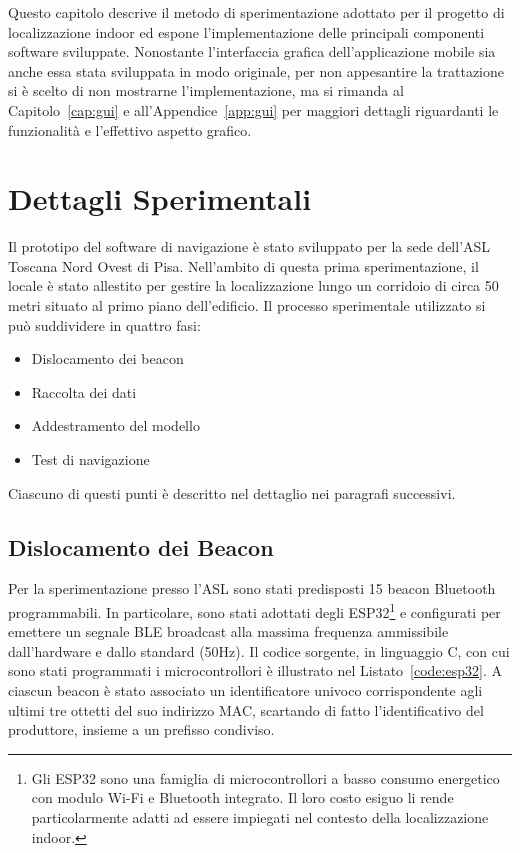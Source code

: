 \newcommand{\inputsource}[2]{%
	\inputminted[frame=single, framesep=1pt,
  breaklines=true,fontsize=\footnotesize]{#1}{#2}%
}


Questo capitolo descrive il metodo di sperimentazione adottato per il progetto
di localizzazione indoor ed espone l'implementazione delle principali
componenti software sviluppate. Nonostante l'interfaccia grafica
dell'applicazione mobile sia anche essa stata sviluppata in modo originale, per
non appesantire la trattazione si è scelto di non mostrarne l'implementazione,
ma si rimanda al Capitolo~\ref{cap:gui} e all'Appendice~\ref{app:gui} per
maggiori dettagli riguardanti le funzionalità e l'effettivo aspetto grafico.

\section{Dettagli Sperimentali}
Il prototipo del software di navigazione è stato sviluppato per la sede
dell'ASL Toscana Nord Ovest di Pisa. Nell'ambito di questa prima
sperimentazione, il locale è stato allestito per gestire la localizzazione
lungo un corridoio di circa 50 metri situato al primo piano dell'edificio. Il
processo sperimentale utilizzato si può suddividere in quattro fasi:
\begin{itemize}
	\item Dislocamento dei beacon
	\item Raccolta dei dati
	\item Addestramento del modello
	\item Test di navigazione
\end{itemize}
Ciascuno di questi punti è descritto nel dettaglio nei paragrafi successivi.
\subsection{Dislocamento dei Beacon}
Per la sperimentazione presso l'ASL sono stati predisposti 15 beacon Bluetooth
programmabili. In particolare, sono stati adottati degli ESP32\footnote{Gli
  ESP32 sono una famiglia di microcontrollori a basso consumo energetico con
  modulo Wi-Fi e Bluetooth integrato. Il loro costo esiguo li rende
  particolarmente adatti ad essere impiegati nel contesto della localizzazione
  indoor.} e configurati per emettere un segnale
BLE broadcast alla massima frequenza ammissibile dall'hardware e dallo standard
(50Hz). Il codice sorgente, in linguaggio C, con cui sono stati programmati i
microcontrollori è illustrato nel Listato~\ref{code:esp32}. A ciascun beacon è
stato associato un identificatore univoco corrispondente agli ultimi tre
ottetti del suo indirizzo MAC, scartando di fatto l'identificativo del
produttore, insieme a un prefisso condiviso.

